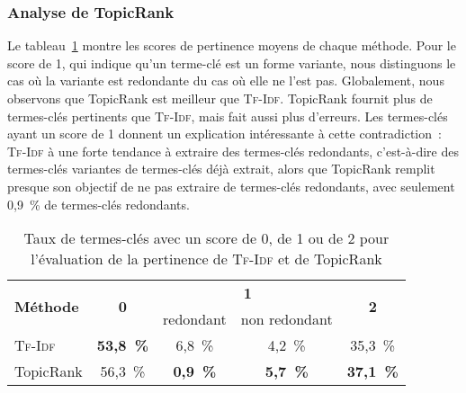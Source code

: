       \subsubsection{Analyse de TopicRank}
      \label{subsubsec:main-domain_specific_keyphrase_annotation-manual_evaluation-analysis-topicrank}
        Le
        tableau~\ref{tab:main-automatic_evaluation_of_keyphrase_annotation-results-topicrank-pertinence_score_ratio}
        montre les scores de pertinence moyens de chaque méthode. Pour le score
        de 1, qui indique qu'un terme-clé est un forme variante, nous
        distinguons le cas où la variante est redondante du cas où elle ne l'est
        pas. Globalement, nous observons que TopicRank est meilleur que
        \textsc{Tf-Idf}. TopicRank fournit plus de termes-clés pertinents que
        \textsc{Tf-Idf}, mais fait aussi plus d'erreurs. Les termes-clés ayant
        un score de 1 donnent un explication intéressante à cette
        contradiction~: \textsc{Tf-Idf} à une forte tendance à extraire des
        termes-clés redondants, c'est-à-dire des termes-clés variantes de
        termes-clés déjà extrait, alors que TopicRank remplit presque son
        objectif de ne pas extraire de termes-clés redondants, avec seulement
        0,9~\% de termes-clés redondants.
        \begin{table}[h!]
          \centering
          \begin{tabular}{l|c|c|c|c}
            \toprule
            \multirow{2}{*}{\textbf{Méthode}} & \multirow{2}{*}{\textbf{0}} & \multicolumn{2}{c|}{\textbf{1}} & \multirow{2}{*}{\textbf{2}}\\
            \cline{3-4}
            & & \multicolumn{1}{p{.175\linewidth}|}{\centering{}redondant} & \multicolumn{1}{p{.175\linewidth}|}{\centering{}non redondant} &\\
            \hline
            \textsc{Tf-Idf} & \textbf{53,8~\%} & 6,8~\% & 4,2~\% & 35,3~\%\\
            TopicRank & 56,3~\% & \textbf{0,9~\%} & \textbf{5,7~\%} & \textbf{37,1~\%}\\
            \bottomrule
          \end{tabular}
          \caption{Taux de termes-clés avec un score de 0, de 1 ou de 2 pour
                   l'évaluation de la pertinence de \textsc{Tf-Idf} et de
                   TopicRank
                   \label{tab:main-automatic_evaluation_of_keyphrase_annotation-results-topicrank-pertinence_score_ratio}}
        \end{table}

